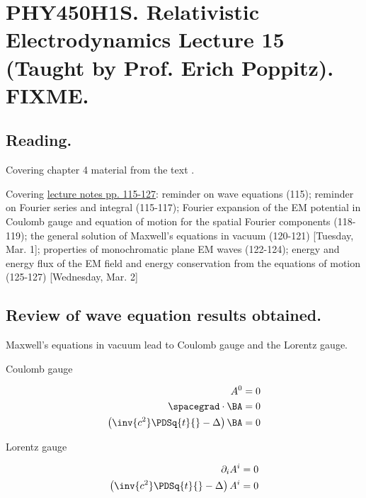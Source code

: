 
%

\chapter{PHY450H1S.  Relativistic Electrodynamics Lecture 15 (Taught by Prof. Erich Poppitz).  FIXME.}
\label{chap:relativisticElectrodynamicsL15}
{}
\date{Mar 1, 2011}

\beginArtNoToc

\section{Reading.}

Covering chapter 4 material from the text \cite{landau1980classical}.

Covering \href{http://www.physics.utoronto.ca/~poppitz/e-poppitz/PHY450_files/RelEMpp115-127.pdf}{lecture notes pp. 115-127}: reminder on wave equations (115); reminder on Fourier series and integral (115-117); Fourier expansion of the EM potential in Coulomb gauge and equation of motion for the spatial Fourier components (118-119); the general solution of Maxwell's equations in vacuum (120-121) [Tuesday, Mar. 1]; properties of monochromatic plane EM waves (122-124); energy and energy flux of the EM field and energy conservation from the equations of motion (125-127)  [Wednesday, Mar. 2]

\section{Review of wave equation results obtained.}

Maxwell's equations in vacuum lead to Coulomb gauge and the Lorentz gauge.

Coulomb gauge

\begin{align}\label{eqn:relativisticElectrodynamicsL15:10}
A^0 &= 0 \\
\spacegrad \cdot \BA &= 0 \\
\left( \inv{c^2} \PDSq{t}{} - \Delta \right) \BA &= 0
\end{align}

Lorentz gauge

\begin{align}\label{eqn:relativisticElectrodynamicsL15:30}
\partial_i A^i &= 0 \\
\left( \inv{c^2} \PDSq{t}{} - \Delta \right) A^i &= 0
\end{align}

